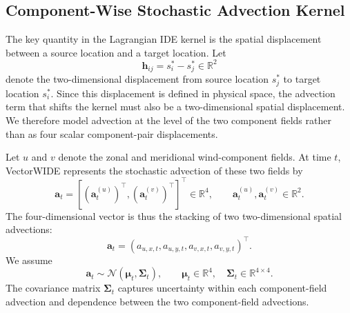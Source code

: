 \subsection{Component-Wise Stochastic Advection Kernel}
\label{subsec:component_advection_kernel}

The key quantity in the Lagrangian IDE kernel is the spatial displacement
between a source location and a target location. Let
\[
\mathbf h_{ij}=s_i^\ast-s_j^\ast\in\mathbb R^2
\]
denote the two-dimensional displacement from source location \(s_j^\ast\) to
target location \(s_i^\ast\). Since this displacement is defined in physical
space, the advection term that shifts the kernel must also be a
two-dimensional spatial displacement. We therefore model advection at the level
of the two component fields rather than as four scalar component-pair
displacements.

Let \(u\) and \(v\) denote the zonal and meridional wind-component fields. At
time \(t\), VectorWIDE represents the stochastic advection of these two fields
by
\begin{equation}
\boldsymbol a_t
=
\left[
\left(\boldsymbol a_t^{(u)}\right)^\top,
\left(\boldsymbol a_t^{(v)}\right)^\top
\right]^\top
\in\mathbb R^4,
\qquad
\boldsymbol a_t^{(u)},\boldsymbol a_t^{(v)}\in\mathbb R^2 .
\end{equation}
The four-dimensional vector is thus the stacking of two two-dimensional
spatial advections:
\[
\boldsymbol a_t =
(a_{u,x,t},a_{u,y,t},a_{v,x,t},a_{v,y,t})^\top .
\]
We assume
\begin{equation}
\boldsymbol a_t
\sim
\mathcal N(\boldsymbol\mu_t,\boldsymbol\Sigma_t),
\qquad
\boldsymbol\mu_t\in\mathbb R^4,\quad
\boldsymbol\Sigma_t\in\mathbb R^{4\times4}.
\label{eq:component_advection_distribution}
\end{equation}
The covariance matrix \(\boldsymbol\Sigma_t\) captures uncertainty within each
component-field advection and dependence between the two component-field
advections.

